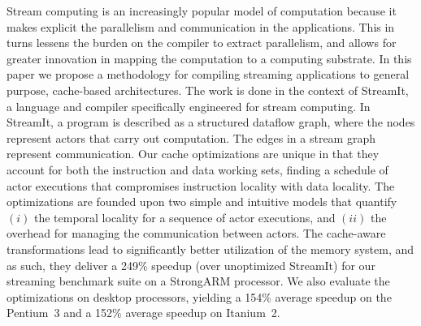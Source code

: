 
Stream computing is an increasingly popular model of computation
because it makes explicit the parallelism and communication in the
applications. This in turns lessens the burden on the compiler to
extract parallelism, and allows for greater innovation in mapping the
computation to a computing substrate. In this paper we propose a
methodology for compiling streaming applications to general purpose,
cache-based architectures. The work is done in the context of
StreamIt, a language and compiler specifically engineered for stream
computing. In StreamIt, a program is described as a structured dataflow
graph, where the nodes represent actors that carry out 
computation. The edges in a stream graph represent
communication. Our cache optimizations are unique in that they 
account for both the instruction and data working sets, finding a
schedule of actor executions that compromises instruction locality
with data locality.  The
optimizations are founded upon two simple and intuitive models that
quantify $(i)$ the temporal locality for a sequence of  actor
executions, and $(ii)$ the overhead for managing the communication
between actors. The cache-aware transformations lead to significantly
better utilization of the memory system, and as such, they deliver
a 249\% speedup (over unoptimized StreamIt) for our streaming benchmark 
suite on a StrongARM processor.  We also evaluate the optimizations on 
desktop processors, yielding a 154\% average speedup on the Pentium~3 
and a 152\% average speedup on Itanium~2.

